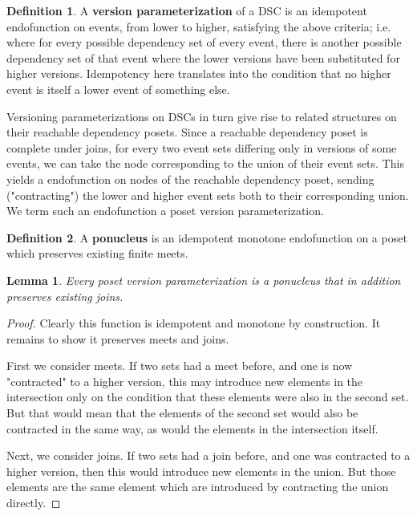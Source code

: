 \documentclass[hoptionsi,review,format=acmsmall]{acmart}
\newtheorem{lemma}[theorem]{Lemma}
\theoremstyle{definition}
\newtheorem{definition}{Definition}[section]
\begin{document}
\begin{definition}
A \textbf{version parameterization} of a DSC is an idempotent endofunction on events, from lower to higher, satisfying the above criteria; i.e. where for every possible dependency set of every event, there is another possible dependency set of that event where the lower versions have been substituted for higher versions. Idempotency here translates into the condition that no higher event is itself a lower event of something else.
\end{definition}


Versioning parameterizations on DSCs in turn give rise to related structures on their reachable dependency posets. Since a reachable dependency poset is complete under joins, for every two event sets differing only in versions of some events, we can take the node corresponding to the union of their event sets. This yields a  endofunction on nodes of the reachable dependency poset, sending ("contracting") the lower and higher event sets both to their corresponding union. We term such an endofunction a poset version parameterization.

\begin{definition}
A \textbf{ponucleus} is an idempotent monotone endofunction on a poset which preserves existing finite meets.
\end{definition}

\begin{lemma}
Every poset version parameterization is a ponucleus that in addition preserves existing joins.
\end{lemma}

\begin{proof}
Clearly this function is idempotent and monotone by construction. It remains to show it preserves meets and joins.

First we consider meets. If two sets had a meet before, and one is now "contracted" to a higher version, this may introduce new elements in the intersection only on the condition that these elements were also in the second set. But that would mean that the elements of the second set would also be contracted in the same way, as would the elements in the intersection itself.

Next, we consider joins. If two sets had a join before, and one was contracted to a higher version, then this would introduce new elements in the union. But those elements are the same element which are introduced by contracting the union directly.
\end{proof}
\end{document}
